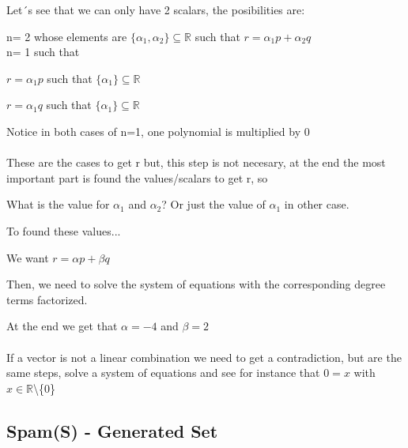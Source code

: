 \documentclass{article}
\begin{document}
Let´s see that we can only have 2 scalars, the posibilities are:

n= 2 whose elements are \(\{ \alpha_1, \alpha_2\} \subseteq \mathbb{R}\) such that \(r=\alpha_1 p + \alpha_2 q\)
\\

n= 1 such that

\(r = \alpha_1 p\) such that \(\{\alpha_1\} \subseteq \mathbb{R}\)

\(r = \alpha_1 q\) such that \(\{\alpha_1\} \subseteq \mathbb{R}\)

Notice in both cases of n=1, one polynomial is multiplied by 0
\\
\\
These are the cases to get r but, this step is not necesary, at the end the most important part is found the values/scalars to get r, so

What is the value for \(\alpha_1\) and \(\alpha_2\)? Or just the value of \(\alpha_1\) in other case.

To found these values...

We want \(r=\alpha p + \beta q\)

Then, we need to solve the system of equations with the corresponding degree terms factorized. 

At the end we get that \(\alpha = -4\) and \(\beta = 2\)
\\
\\
If a vector is not a linear combination we need to get a contradiction, but are the same steps, solve a system of equations and see for instance that \(0=x\) with \(x\in \mathbb{R}\)\textbackslash \{0\}\

\subsection*{Spam(S) - Generated Set}
\end{document}
